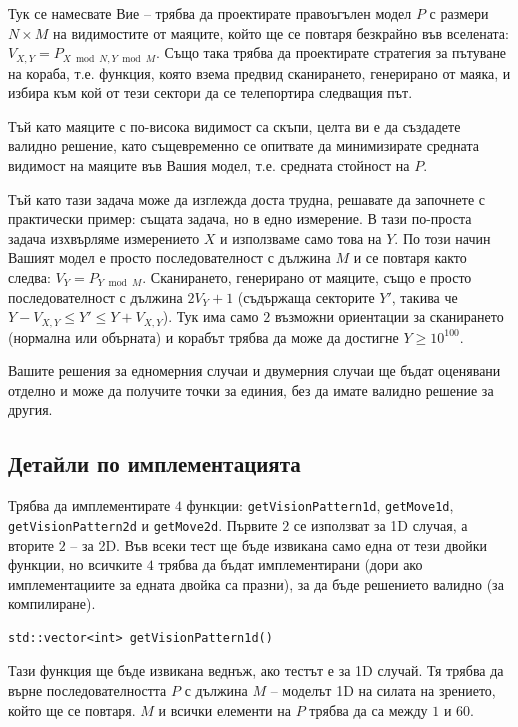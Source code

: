 \documentclass[12pt]{article}
\begin{document}
Тук се намесвате Вие -- трябва да проектирате правоъгълен модел $P$ с размери $N \times M$ на видимостите от маяците, който ще се повтаря безкрайно във вселената: $V_{X, Y} = P_{X \bmod N, Y \bmod M}$. Също така трябва да проектирате стратегия за пътуване на кораба, т.е. функция, която взема предвид сканирането, генерирано от маяка, и избира към кой от тези сектори да се телепортира следващия път.

Тъй като маяците с по-висока видимост са скъпи, целта ви е да създадете валидно решение, като същевременно се опитвате да минимизирате средната видимост на маяците във Вашия модел, т.е. средната стойност на $P$.

Тъй като тази задача може да изглежда доста трудна, решавате да започнете с практически пример: същата задача, но в едно измерение. В тази по-проста задача изхвърляме измерението $X$ и използваме само това на $Y$. По този начин Вашият модел е просто последователност с дължина $M$ и се повтаря както следва: $V_Y = P_{Y \bmod M}$. Сканирането, генерирано от маяците, също е просто последователност с дължина $2V_Y + 1$ (съдържаща секторите $Y'$, такива че $Y - V_{X, Y} \leq Y' \leq Y + V_{X, Y}$). Тук има само $2$ възможни ориентации за сканирането (нормална или обърната) и корабът трябва да може да достигне $Y \geq 10^{100}$.

Вашите решения за едномерния случаи и двумерния случаи ще бъдат оценявани отделно и може да получите точки за единия, без да имате валидно решение за другия.

\subsection{Детайли по имплементацията}
\smallskip

Трябва да имплементирате $4$ функции: \verb|getVisionPattern1d|, \verb|getMove1d|, \verb|getVisionPattern2d| и \verb|getMove2d|. Първите $2$ се използват за 1D случая, а вторите $2$ -- за 2D. Във всеки тест ще бъде извикана само една от тези двойки функции, но всичките $4$ трябва да бъдат имплементирани (дори ако имплементациите за едната двойка са празни), за да бъде решението валидно (за компилиране).

\begin{lstlisting}
std::vector<int> getVisionPattern1d()
\end{lstlisting}

Тази функция ще бъде извикана веднъж, ако тестът е за 1D случай. Тя трябва да върне последователността $P$ с дължина $M$ -- моделът 1D на силата на зрението, който ще се повтаря. $M$ и всички елементи на $P$ трябва да са между $1$ и $60$.
\end{document}

